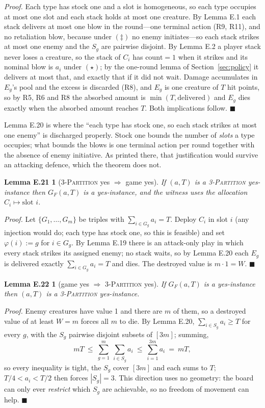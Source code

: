 \documentclass[11pt,a4paper]{article}
\theoremstyle{plain}
\newtheorem*{lemEyesfour}{Lemma E.21}
\newtheorem*{lemEnofour}{Lemma E.22}
\theoremstyle{definition}
\theoremstyle{plain}
\theoremstyle{definition}
\theoremstyle{remark}
\newcommand{\THREEPART}{\textsc{3-Partition}}
\newcommand{\qedbox}{\hfill$\blacksquare$}
\begin{document}
\noindent\emph{Proof.} Each type has stock one and a slot is homogeneous, so each type
occupies at most one slot and each stack holds at most one creature. By Lemma E.1 each stack
delivers at most one blow in the round---one terminal action (R9, R11), and no retaliation
blow, because under $(\ddagger)$ no enemy initiates---so each stack strikes at most one enemy
and the $S_g$ are pairwise disjoint. By Lemma E.2 a player stack never loses a creature, so
the stack of $C_i$ has $\mathrm{count}=1$ when it strikes and its nominal blow is $a_i$ under
$(\star)$; by the one-round lemma of Section~\ref{sec:policy} it delivers at most that, and
exactly that if it did not wait. Damage accumulates in $E_g$'s pool and the excess is
discarded (R8), and $E_g$ is one creature of $T$ hit points, so by R5, R6 and R8 the absorbed
amount is $\min(T,\text{delivered})$ and $E_g$ dies exactly when the absorbed amount reaches
$T$. Both implications follow. \qedbox

\smallskip
Lemma E.20 is where the ``each type has stock one, so each stack strikes at most one
enemy'' is discharged properly. Stock one bounds the number of \emph{slots} a type occupies;
what bounds the blows is one terminal action per round together with the absence of enemy
initiative. As printed there, that justification would survive an attacking defence, which the
theorem does not.

\begin{lemEyesfour}[\THREEPART{} yes $\Longrightarrow$ game yes]
If $(a,T)$ is a \THREEPART{} yes-instance then $G_F(a,T)$ is a yes-instance, and the witness
uses the allocation $C_i\mapsto\text{slot } i$.
\end{lemEyesfour}

\noindent\emph{Proof.} Let $\{G_1,\dots,G_m\}$ be triples with $\sum_{i\in G_g}a_i=T$. Deploy
$C_i$ in slot $i$ (any injection would do; each type has stock one, so this is feasible) and
set $\varphi(i):=g$ for $i\in G_g$. By Lemma E.19 there is an attack-only play in which every
stack strikes its assigned enemy; no stack waits, so by Lemma E.20 each $E_g$ is delivered
exactly $\sum_{i\in G_g}a_i=T$ and dies. The destroyed value is $m\cdot 1=W$. \qedbox

\begin{lemEnofour}[game yes $\Longrightarrow$ \THREEPART{} yes]
If $G_F(a,T)$ is a yes-instance then $(a,T)$ is a \THREEPART{} yes-instance.
\end{lemEnofour}

\noindent\emph{Proof.} Enemy creatures have value 1 and there are $m$ of them, so a destroyed
value of at least $W=m$ forces all $m$ to die. By Lemma E.20, $\sum_{i\in S_g}a_i\ge T$ for
every $g$, with the $S_g$ pairwise disjoint subsets of $[3m]$; summing,
\[
  mT\ \le\ \sum_{g=1}^{m}\ \sum_{i\in S_g}a_i\ \le\ \sum_{i=1}^{3m}a_i\ =\ mT ,
\]
so every inequality is tight, the $S_g$ cover $[3m]$ and each sums to $T$; $T/4<a_i<T/2$ then
forces $|S_g|=3$. This direction uses no geometry: the board can only ever \emph{restrict}
which $S_g$ are achievable, so no freedom of movement can help. \qedbox
\end{document}
